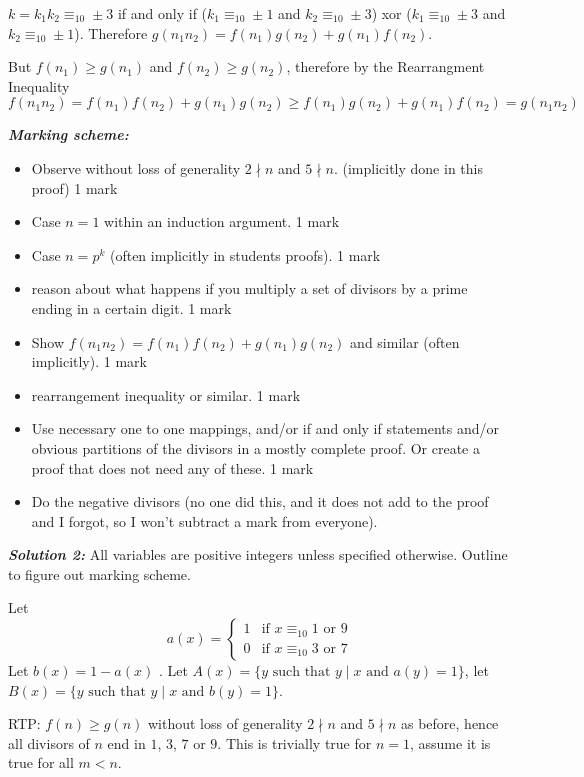 \documentclass[12pt]{article}
\newcommand{\solnum}[1]{\textbf{\textit{Solution #1: }}}
\begin{document}
\begin{enumerate}[topsep=\bigskipamount,itemsep=\bigskipamount,leftmargin=0pt]
$k = k_1 k_2\equiv_{10} \pm 3$ if and only if ($k_1\equiv_{10} \pm 1$ and $k_2\equiv_{10} \pm 3$) xor ($k_1\equiv_{10} \pm 3$ and $k_2\equiv_{10} \pm 1$).
Therefore $g(n_1 n_2) = f(n_1) g(n_2) + g(n_1) f(n_2)$.

But $f(n_1) \geq g(n_1)$ and $f(n_2) \geq g(n_2)$,
therefore by the Rearrangment Inequality 
$$f(n_1 n_2) = f(n_1) f(n_2) + g(n_1) g(n_2) \geq f(n_1) g(n_2) + g(n_1) f(n_2) = g(n_1 n_2)$$

\textit{\textbf{Marking scheme:}}
\begin{itemize}
    \item Observe without loss of generality $2\nmid n$ and $5\nmid n$.
    (implicitly done in this proof) 1 mark
    \item Case $n=1$ within an induction argument. 1 mark
    \item Case $n=p^k$ (often implicitly in students proofs). 1 mark
    \item reason about what happens if you multiply a set of divisors by a prime ending in a certain digit. 1 mark
    \item Show $f(n_1 n_2) = f(n_1) f(n_2) + g(n_1) g(n_2)$
    and similar (often implicitly). 1 mark
    \item rearrangement inequality or similar. 1 mark
    \item Use necessary one to one mappings, and/or if and only if statements and/or obvious partitions of the divisors in a mostly complete proof. Or create a proof that does not need any of these. 1 mark
    \item Do the negative divisors 
    (no one did this, 
    and it does not add to the proof
    and I forgot, so I won't subtract a mark from everyone).
\end{itemize}


\solnum{2} 
All variables are positive integers unless specified otherwise.
Outline to figure out marking scheme.

Let 
$$a(x)=\begin{cases}
    1 & \text{if } x\equiv_{10} 1 \text{ or } 9\\
    0 & \text{if } x\equiv_{10} 3 \text{ or } 7
\end{cases}$$ 
Let $b(x)=1-a(x)$ .
Let $A(x) = \{y \text{ such that } y \mid x \text{ and } a(y)=1\}$,
let $B(x) = \{y \text{ such that } y \mid x \text{ and } b(y)=1\}$.

RTP: $f(n)\geq g(n)$
without loss of generality $2\nmid n$ and $5\nmid n$ as before,
hence all divisors of $n$ end in $1$, $3$, $7$ or $9$.
This is trivially true for $n=1$,
assume it is true for all $m<n$.



\end{enumerate}
\end{document}
